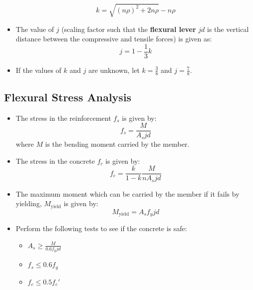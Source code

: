 \documentclass{article}
\begin{document}
\begin{itemize}
    \begin{equation}
        k = \sqrt{(n\rho)^2+2n\rho}-n\rho
        \label{eq:}
    \end{equation}
    \item The value of $j$ (scaling factor such that the \textbf{flexural lever} $jd$ is the vertical distance between the compressive and tensile forces) is given as:
    \begin{equation}
        j = 1 - \frac{1}{3}k
        \label{eq:}
    \end{equation}
    \item If the values of $k$ and $j$ are unknown, let $k=\frac{3}{8}$ and $j=\frac{7}{8}$.
\end{itemize}
\subsection{Flexural Stress Analysis}
\begin{itemize}
    \item The stress in the reinforcement $f_s$ is given by:
    \begin{equation}
        f_s = \frac{M}{A_sjd}
        \label{eq:}
    \end{equation}
    where $M$ is the bending moment carried by the member.
    \item The stress in the concrete $f_c$ is given by:
    \begin{equation}
        f_c = \frac{k}{1-k}\frac{M}{nA_sjd}
        \label{eq:}
    \end{equation}
    \item The maximum moment which can be carried by the member if it fails by yielding, $M_\text{yield}$ is given by:
    \begin{equation}
        M_\text{yield} = A_sf_yjd
        \label{eq:}
    \end{equation}
    \item Perform the following tests to see if the concrete is safe:
    \begin{itemize}
        \item $A_s \ge \frac{M}{0.6f_yjd}$
        \item $f_s \le 0.6f_y$
        \item $f_c \le 0.5f_c'$
    \end{itemize}
\end{itemize}
\end{document}
